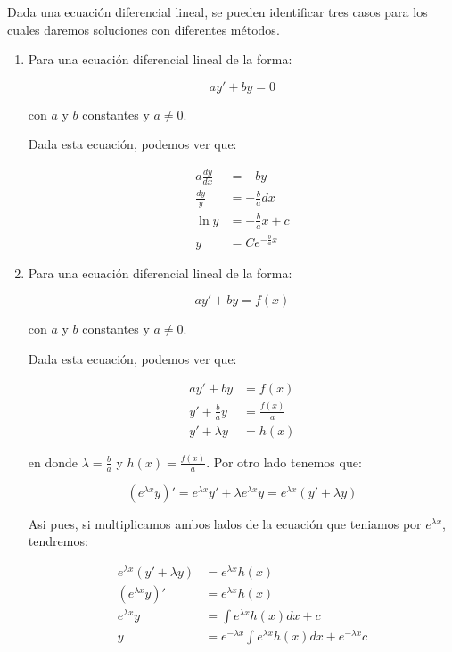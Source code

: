 		Dada una ecuación diferencial lineal, se pueden identificar tres casos para los cuales daremos soluciones con diferentes métodos.

		\begin{enumerate}
			\item Para una ecuación diferencial lineal de la forma:

			\begin{equation}
				a y' + b y = 0
			\end{equation}

			con $a$ y $b$ constantes y $a \ne 0$.

			Dada esta ecuación, podemos ver que:

			\begin{align*}
				a \frac{dy}{dx} &= -b y \\
				\frac{dy}{y} &= -\frac{b}{a} dx \\
				\ln{y} &= -\frac{b}{a} x + c \\
				y &= C e^{-\frac{b}{a} x}
			\end{align*}

			\item Para una ecuación diferencial lineal de la forma:

			\begin{equation}
				a y' + b y = f(x)
			\end{equation}

			con $a$ y $b$ constantes y $a \ne 0$.

			Dada esta ecuación, podemos ver que:

			\begin{align*}
				a y' + b y &= f(x) \\
				y' + \frac{b}{a} y &= \frac{f(x)}{a} \\
				y' + \lambda y &= h(x)
			\end{align*}

			en donde $\lambda = \frac{b}{a}$ y $h(x) = \frac{f(x)}{a}$.
			Por otro lado tenemos que:

			\begin{equation*}
				(e^{\lambda x} y)' = e^{\lambda x} y' + \lambda e^{\lambda x} y = e^{\lambda x} (y' + \lambda y)
			\end{equation*}

			Asi pues, si multiplicamos ambos lados de la ecuación que teniamos por $e^{\lambda x}$, tendremos:

			\begin{align*}
				e^{\lambda x} (y' + \lambda y) &= e^{\lambda x} h(x) \\
				(e^{\lambda x} y)' &= e^{\lambda x} h(x) \\
				e^{\lambda x} y &= \int e^{\lambda x} h(x) dx + c \\
				y &= e^{-\lambda x} \int e^{\lambda x} h(x) dx + e^{-\lambda x}c
			\end{align*}


\end{enumerate}
